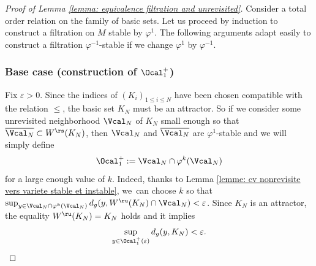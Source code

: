 \begin{proof}[Proof of Lemma \ref{lemma: equivalence filtration and unrevisited}] Consider a total order relation on the family of basic sets. Let us proceed by induction to construct a filtration on $M$ stable by $\varphi^{1}$. The following arguments adapt easily to construct a filtration $\varphi^{-1}$-stable if we change $\varphi^1$ by $\varphi^{-1}$.

\subsubsection*{Base case (construction of $\Ocal_1^+$)}
Fix $\varepsilon > 0$. Since the indices of $(K_i)_{1 \leq i \leq N}$ have been chosen compatible with the relation $\leq$, the basic set $K_{N}$ must be an attractor. So if we consider some unrevisited neighborhood $\Vcal_{N}$ of $K_N$ small enough so that $\overline{\Vcal_N} \subset W^\rs(K_N)$, then $\Vcal_N$ and $\overline{\Vcal_N}$ are $\varphi^1$-stable and we will simply define
\[
\Ocal_{1}^+:= \Vcal_N \cap \varphi^{k}(\Vcal_{N})
\]
for a large enough value of $k$. Indeed, thanks to Lemma \ref{lemme: cv nonrevisite vers variete stable et instable}, we~can choose $k$ so that $\sup_{y \in \Vcal_N \cap \varphi^{k}(\Vcal_{N})} d_g (y, W^\ru (K_{N}) \cap \Vcal_N) < \varepsilon $. Since $K_N$ is an attractor, the equality $W^\ru (K_N) = K_N$ holds and it implies
\[
\sup_{y \in \Ocal_{1}^+ (\varepsilon)} d_g (y, K_N) < \varepsilon.
\]


\end{proof}
